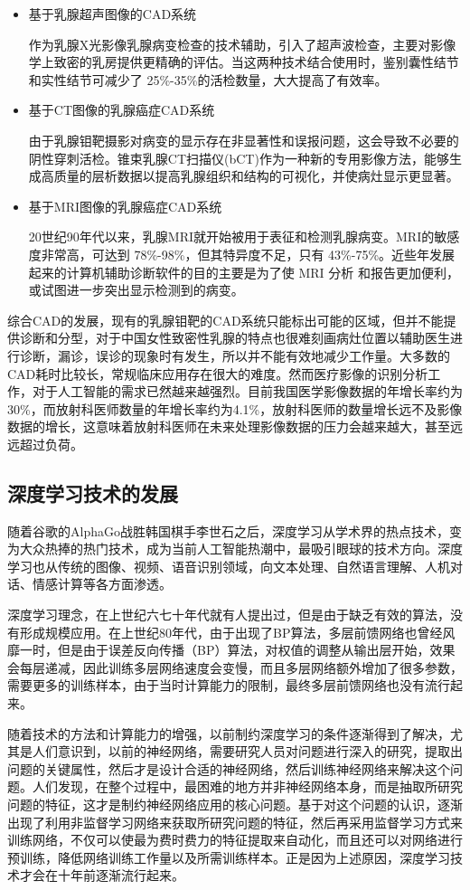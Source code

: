 \begin{itemize}
	\item 基于乳腺超声图像的CAD系统	
	
	作为乳腺X光影像乳腺病变检查的技术辅助，引入了超声波检查，主要对影像学上致密的乳房提供更精确的评估。当这两种技术结合使用时，鉴别囊性结节和实性结节可减少了 25\%-35\%的活检数量，大大提高了有效率。
	\item 基于CT图像的乳腺癌症CAD系统
	
	由于乳腺钼靶摄影对病变的显示存在非显著性和误报问题，这会导致不必要的阴性穿刺活检。锥束乳腺CT扫描仪(bCT)作为一种新的专用影像方法，能够生成高质量的层析数据以提高乳腺组织和结构的可视化，并使病灶显示更显著。
	
	\item 基于MRI图像的乳腺癌症CAD系统
	
	 20世纪90年代以来，乳腺MRI就开始被用于表征和检测乳腺病变。MRI的敏感度非常高，可达到 78\%-98\%，但其特异度不足，只有 43\%-75\%。近些年发展起来的计算机辅助诊断软件的目的主要是为了使 MRI 分析
和报告更加便利，或试图进一步突出显示检测到的病变。
\end{itemize}

综合CAD的发展，现有的乳腺钼靶的CAD系统只能标出可能的区域，但并不能提供诊断和分型，对于中国女性致密性乳腺的特点也很难刻画病灶位置以辅助医生进行诊断，漏诊，误诊的现象时有发生，所以并不能有效地减少工作量。大多数的CAD耗时比较长，常规临床应用存在很大的难度。然而医疗影像的识别分析工作，对于人工智能的需求已然越来越强烈。目前我国医学影像数据的年增长率约为30\%，而放射科医师数量的年增长率约为4.1\%，放射科医师的数量增长远不及影像数据的增长，这意味着放射科医师在未来处理影像数据的压力会越来越大，甚至远远超过负荷。
\subsection{深度学习技术的发展}
随着谷歌的AlphaGo战胜韩国棋手李世石之后，深度学习从学术界的热点技术，变为大众热捧的热门技术，成为当前人工智能热潮中，最吸引眼球的技术方向。深度学习也从传统的图像、视频、语音识别领域，向文本处理、自然语言理解、人机对话、情感计算等各方面渗透。

深度学习理念，在上世纪六七十年代就有人提出过，但是由于缺乏有效的算法，没有形成规模应用。在上世纪80年代，由于出现了BP算法\cite{5riedmiller1993direct}，多层前馈网络也曾经风靡一时，但是由于误差反向传播（BP）算法，对权值的调整从输出层开始，效果会每层递减，因此训练多层网络速度会变慢，而且多层网络额外增加了很多参数，需要更多的训练样本，由于当时计算能力的限制，最终多层前馈网络也没有流行起来。

随着技术的方法和计算能力的增强，以前制约深度学习的条件逐渐得到了解决，尤其是人们意识到，以前的神经网络，需要研究人员对问题进行深入的研究，提取出问题的关键属性，然后才是设计合适的神经网络，然后训练神经网络来解决这个问题。人们发现，在整个过程中，最困难的地方并非神经网络本身，而是抽取所研究问题的特征，这才是制约神经网络应用的核心问题。基于对这个问题的认识，逐渐出现了利用非监督学习网络来获取所研究问题的特征，然后再采用监督学习方式来训练网络，不仅可以使最为费时费力的特征提取来自动化，而且还可以对网络进行预训练，降低网络训练工作量以及所需训练样本。正是因为上述原因，深度学习技术才会在十年前逐渐流行起来。

